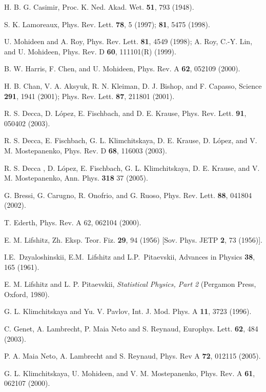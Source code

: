\documentclass[prb]{revtex4}%
\begin{document}
\begin{references}
  H. B. G. Casimir, Proc. K. Ned. Akad. Wet. {\bf 51},
793 (1948).

  S. K. Lamoreaux, Phys. Rev. Lett. {\bf 78}, 5 (1997);
{\bf 81}, 5475 (1998).

  U. Mohideen and A. Roy, Phys. Rev. Lett. {\bf 81},
4549 (1998); A. Roy, C.-Y. Lin, and U. Mohideen, Phys. Rev. D {\bf
60}, 111101(R) (1999).

  B. W. Harris, F. Chen, and U. Mohideen, Phys. Rev. A
{\bf 62}, 052109 (2000).

  H. B. Chan, V. A. Aksyuk, R. N. Kleiman, D. J.
Bishop, and F. Capasso, Science {\bf 291}, 1941 (2001); Phys. Rev.
Lett. {\bf 87}, 211801 (2001).

  R. S. Decca, D. L\'{o}pez, E. Fischbach, and D. E.
Krause, Phys. Rev. Lett. {\bf 91}, 050402 (2003).

  R. S. Decca, E. Fischbach, G. L. Klimchitskaya, D. E.
Krause, D. L\'{o}pez, and V. M. Mostepanenko, Phys. Rev. D {\bf 68},
116003 (2003).

 R. S. Decca , D. L\'{o}pez, E. Fischbach, G. L. Klimchitskaya,
 D. E. Krause, and V. M. Mostepanenko, Ann. Phys. \textbf{318} 37 (2005).

  G. Bressi, G. Carugno, R. Onofrio, and G. Ruoso,
Phys. Rev. Lett. {\bf 88}, 041804 (2002).

  T. Ederth, Phys. Rev. A 62, 062104 (2000).

  E. M. Lifshitz, Zh. Eksp. Teor. Fiz. {\bf 29}, 94 (1956)
[Sov. Phys. JETP {\bf 2}, 73 (1956)].

 I.E.~Dzyaloshinskii, E.M.~Lifshitz and L.P.~Pitaevskii,
Advances in Physics {\bf 38}, 165 (1961).

  E. M. Lifshitz and L. P. Pitaevskii, {\it Statistical
Physics, Part 2} (Pergamon Press, Oxford, 1980).

  G. L. Klimchitskaya and Yu. V. Pavlov, Int. J. Mod.
Phys. A {\bf 11}, 3723 (1996).

 C. Genet, A. Lambrecht, P. Maia Neto and S. Reynaud,
Europhys. Lett. {\bf 62}, 484 (2003).

 P. A. Maia Neto, A. Lambrecht and S. Reynaud, Phys. Rev A {\bf 72}, 012115
(2005).

  G. L. Klimchitskaya, U. Mohideen, and V. M.
Mostepanenko, Phys. Rev. A {\bf 61}, 062107 (2000).


\end{references}
\end{document}
